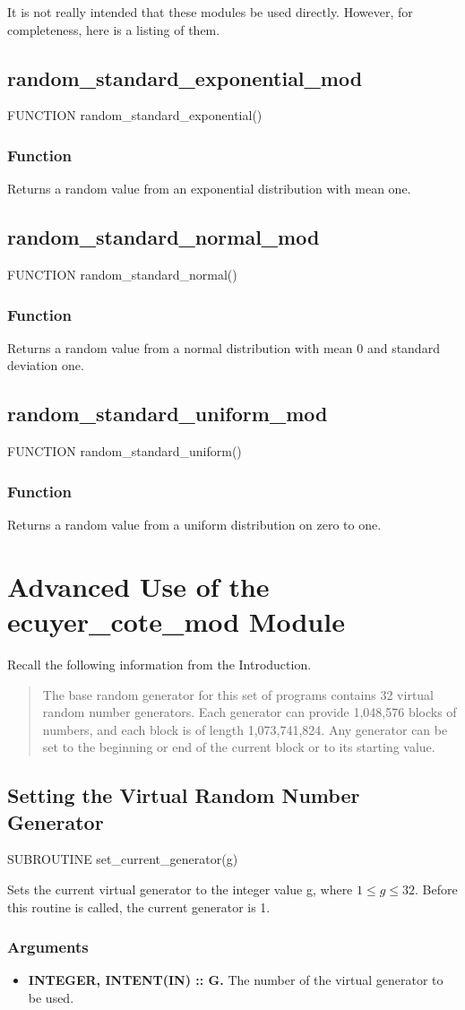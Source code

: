 \documentclass[12pt,dvips]{article}
\newcommand{\mysection}[1]{\color{blue}
            \section{#1} \normalcolor}
\newcommand{\mysubsection}[1] {\color{green}
            \subsection{#1} \normalcolor}
\newcommand{\mysubsubsection}[1]{\color{Orange}
            \subsubsection{#1} \normalcolor}
\newcommand{\myitem}[1]{\item{\bf \color{Violet} #1 \normalcolor}}
\begin{document}
It is not really intended that these modules be used directly.
However, for completeness, here is a listing of them.

\mysubsection{random\_standard\_exponential\_mod}

FUNCTION random\_standard\_exponential()

\mysubsubsection{Function}

Returns a random value from an exponential distribution with mean one.

\mysubsection{random\_standard\_normal\_mod}

FUNCTION random\_standard\_normal()

\mysubsubsection{Function}

Returns a random value from a normal distribution with mean 0 and
standard deviation one.

\mysubsection{random\_standard\_uniform\_mod}

FUNCTION random\_standard\_uniform()

\mysubsubsection{Function}

Returns a random value from a uniform  distribution on zero to one.

\mysection{Advanced Use of the ecuyer\_cote\_mod Module} 

Recall the following information from the Introduction.

\begin{quote}
The base random generator for this set of programs contains 32 virtual
random number generators.  Each generator can provide 1,048,576 blocks
of numbers, and each block  is of length 1,073,741,824.  Any generator
can be  set to the  beginning or  end of the  current block or  to its
starting  value.
\end{quote}

\mysubsection{Setting the Virtual Random Number Generator}

SUBROUTINE set\_current\_generator(g)

Sets  the current virtual generator to  the integer  value g, where $1
\le g \le 32$.   Before this routine  is called, the current generator
is 1.

\mysubsubsection{Arguments}

\begin{itemize}

\myitem{INTEGER, INTENT(IN) :: G.}  The number of the virtual  generator
to be used.

\end{itemize}
\end{document}
